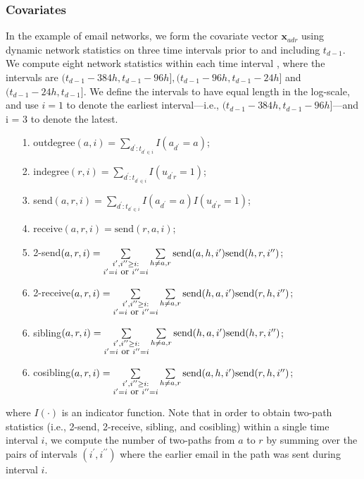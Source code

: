 \documentclass[12pt]{article}
\begin{document}
 	   \subsubsection{Covariates}\label{subsec:Covariates_email}
In the example of email networks, we form the covariate vector $\boldsymbol{x}_{adr}$ using dynamic network statistics on three time intervals prior to and including $t_{d-1}$. We compute eight network statistics within each time interval \cite{PerryWolfe2012}, where the intervals are $(t_{d-1}-384h, t_{d-1}-96h], (t_{d-1}-96h, t_{d-1}-24h]$ and $(t_{d-1}-24h, t_{d-1}]$. We define the intervals to have equal length in the log-scale, and use $i=1$ to denote the earliest interval---i.e., $(t_{d-1}-384h, t_{d-1}-96h]$---and i = 3 to denote the latest. 
\begin{itemize}
	\item[1.] outdegree$(a,i)=\sum\limits_{d^\prime:t_{d^\prime \in i}} I(a_{d^\prime} = a)$;
	\item[2.] indegree$(r,i)=\sum\limits_{d^\prime:t_{d^\prime \in i}} I(u_{d^\prime r} = 1)$;
	\item[3.] send$(a,r,i)=\sum\limits_{d^\prime:t_{d^\prime \in i}} I(a_{d^\prime} = a)I(u_{d^\prime r} = 1)$;
	\item[4.] receive$(a,r,i)=\mbox{send}(r,a,i)$;
	\item[5.] 2-send$(a,r,i) = \sum\limits_{\substack{i^\prime, i^{\prime\prime}\geq i:\\i^\prime = i \mbox{ \small or }i^{\prime\prime}=i}}\sum\limits_{h \neq a, r} \mbox{send}(a,h,i^\prime)\mbox{send}(h,r,i^{\prime\prime})$;
	\item[6.] 2-receive$(a,r,i) = \sum\limits_{\substack{i^\prime, i^{\prime\prime}\geq i:\\i^\prime = i \mbox{ \small or }i^{\prime\prime}=i}}\sum\limits_{h \neq a, r} \mbox{send}(h,a,i^\prime)\mbox{send}(r,h,i^{\prime\prime})$;
	\item[6.] sibling$(a,r,i) =\sum\limits_{\substack{i^\prime, i^{\prime\prime}\geq i:\\i^\prime = i \mbox{ \small or }i^{\prime\prime}=i}}\sum\limits_{h \neq a, r} \mbox{send}(h,a,i^\prime)\mbox{send}(h,r,i^{\prime\prime})$;
	\item[6.] cosibling$(a,r,i) =\sum\limits_{\substack{i^\prime, i^{\prime\prime}\geq i:\\i^\prime = i \mbox{ \small or }i^{\prime\prime}=i}}\sum\limits_{h \neq a, r} \mbox{send}(a,h,i^\prime)\mbox{send}(r,h,i^{\prime\prime})$;
\end{itemize}
where $I(\cdot)$ is an indicator function. Note that in order to obtain two-path statistics (i.e., 2-send, 2-receive, sibling, and cosibling) within a single time interval $i$, we compute the number of two-paths from $a$ to $r$ by summing over the pairs of intervals $(i^\prime, i^{\prime\prime})$ where the earlier email in the path was sent during interval $i$. 
\end{document}
